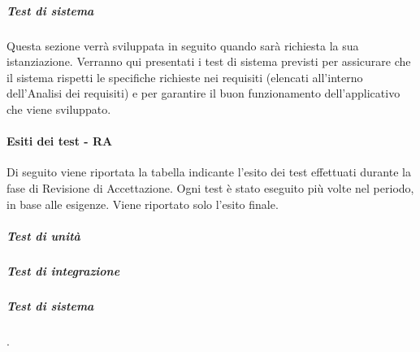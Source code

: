 \subparagraph{Test di sistema} 

Questa sezione verrà sviluppata in seguito quando sarà richiesta la sua istanziazione.  Verranno qui presentati i test di sistema previsti per assicurare che il sistema rispetti le specifiche richieste nei requisiti (elencati all'interno dell'Analisi dei  requisiti)  e  per  garantire  il  buon  funzionamento  dell'applicativo  che  viene sviluppato.
\pagebreak
\paragraph{Esiti dei test - RA}

Di seguito viene riportata la tabella indicante l'esito dei test effettuati durante la fase di Revisione di Accettazione. Ogni test è stato eseguito più volte nel periodo, in base alle esigenze. Viene riportato solo l'esito finale.

\subparagraph{Test di unità}

\subparagraph{Test di integrazione}

\subparagraph{Test di sistema}
{\color{white}.}
\renewcommand{\arraystretch}{1.5}

